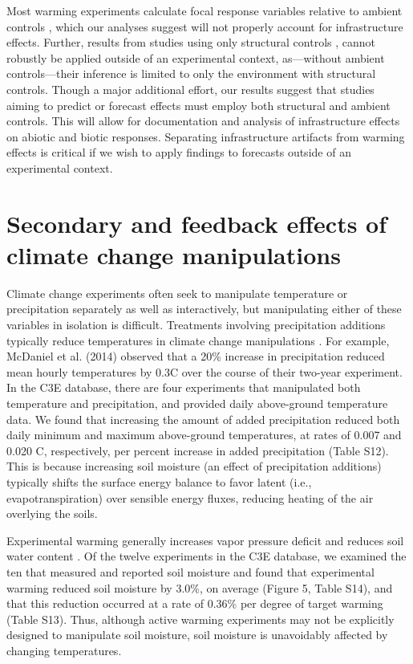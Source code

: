 \documentclass{article}
\begin{document}
\par Most warming experiments calculate focal response variables relative to ambient controls \citep [e.g.,][]{price1998,dunne2003,cleland2006,morin2010,marchin2015}, which our analyses suggest will not properly account for infrastructure effects. Further, results from studies using only structural controls \citep [e.g.,][]{sherry2007,hoeppner2012, rollinson2012}, cannot robustly be applied outside of an experimental context, as---without ambient controls---their inference is limited to only the environment with structural controls. Though a major additional effort, our results suggest that studies aiming to predict or forecast effects must employ both structural and ambient controls. This will allow for documentation and analysis of infrastructure effects on abiotic and biotic responses. Separating infrastructure artifacts from warming effects is critical if we wish to apply findings to forecasts outside of an experimental context. 
\section* {Secondary and feedback effects of climate change manipulations} 
Climate change experiments often seek to manipulate temperature or precipitation separately as well as interactively, but manipulating either of these variables in isolation is difficult.  Treatments involving precipitation additions typically reduce temperatures in climate change manipulations \citep{sherry2007,rollinson2012,mcdaniel2014}. For example, McDaniel et al. (2014) observed that a 20\% increase in precipitation reduced mean hourly temperatures by 0.3\degree C over the course of their two-year experiment. In the C3E database, there are four experiments that manipulated both temperature and precipitation, and provided daily above-ground temperature data. We found that increasing the amount of added precipitation reduced both daily minimum and maximum above-ground temperatures, at rates of 0.007 and 0.020 \degree C, respectively, per percent increase in added precipitation (Table S12). This is because increasing soil moisture (an effect of precipitation additions) typically shifts the surface energy balance to favor latent (i.e., evapotranspiration) over sensible energy fluxes, reducing heating of the air overlying the soils. 
\par Experimental warming generally increases vapor pressure deficit and reduces soil water content \citep[e.g.,][]{sherry2007,morin2010,pelini2014,templer2016}. Of the twelve experiments in the C3E database, we examined the ten that measured and reported soil moisture and found that experimental warming reduced soil moisture by 3.0\%, on average (Figure 5, Table S14), and that this reduction occurred at a rate of 0.36\% per degree of target warming (Table S13). Thus, although active warming experiments may not be explicitly designed to manipulate soil moisture, soil moisture is unavoidably affected by changing temperatures.
\end{document}
